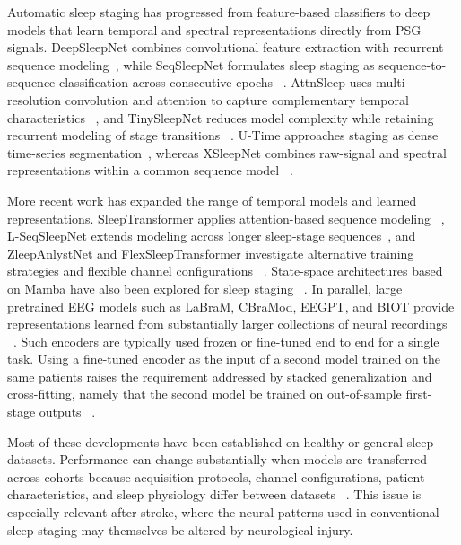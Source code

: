\documentclass{ieeeaccess}
\begin{document}
Automatic sleep staging has progressed from feature-based classifiers to deep
models that learn temporal and spectral representations directly from PSG
signals. DeepSleepNet combines convolutional feature extraction with recurrent
sequence modeling~\cite{supratak2017deepsleepnet}, while SeqSleepNet formulates
sleep staging as sequence-to-sequence classification across consecutive epochs
~\cite{phan2019seqsleepnet}. AttnSleep uses multi-resolution convolution and
attention to capture complementary temporal characteristics
~\cite{eldele2021attnsleep}, and TinySleepNet reduces model complexity while
retaining recurrent modeling of stage transitions
~\cite{supratak2020tinysleepnet}. U-Time approaches staging as dense
time-series segmentation~\cite{perslev2019utime}, whereas XSleepNet combines
raw-signal and spectral representations within a common sequence model
~\cite{phan2021xsleepnet}.

More recent work has expanded the range of temporal models and learned
representations. SleepTransformer applies attention-based sequence modeling
~\cite{sleeptransformer2022}, L-SeqSleepNet extends modeling across longer
sleep-stage sequences~\cite{lseqsleepnet2023}, and ZleepAnlystNet and
FlexSleepTransformer investigate alternative training strategies and flexible
channel configurations
~\cite{jirakittayakorn2024zleep,guo2024flexsleep}. State-space architectures
based on Mamba have also been explored for sleep staging
~\cite{gu2023mamba,bitmamsleep2024}. In parallel, large pretrained EEG models
such as LaBraM, CBraMod, EEGPT, and BIOT provide representations learned from
substantially larger collections of neural recordings
~\cite{labram2024,cbramod2025,eegpt2024,biot2023}. Such encoders are typically
used frozen or fine-tuned end to end for a single task. Using a fine-tuned
encoder as the input of a second model trained on the same patients raises the
requirement addressed by stacked generalization and cross-fitting, namely that the
second model be trained on out-of-sample first-stage outputs
~\cite{wolpert1992stacked,chernozhukov2018dml}.

Most of these developments have been established on healthy or general sleep
datasets. Performance can change substantially when models are transferred
across cohorts because acquisition protocols, channel configurations, patient
characteristics, and sleep physiology differ between datasets
~\cite{guillot2023transfer}. This issue is especially relevant after stroke,
where the neural patterns used in conventional sleep staging may themselves be
altered by neurological injury.
\end{document}
